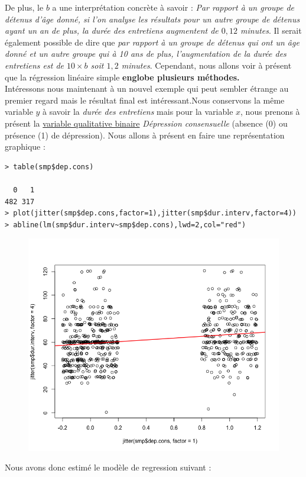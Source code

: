 De plus, le $b$ a une interprétation concrète à savoir : \textit{Par rapport à un groupe de détenus d'âge donné, si l'on analyse les résultats pour un autre groupe de détenus ayant un an de plus, la durée des entretiens augmentent de $0,12$ minutes}. Il serait également possible de dire que \textit{par rapport à un groupe de détenus qui ont un âge donné et un autre groupe qui à 10 ans de plus, l'augmentation de la durée des entretiens est de $10\times b$ soit $1,2$ minutes}.\newline
Cependant, nous allons voir à présent que la régression linéaire simple \textbf{englobe plusieurs méthodes.}\newline
\\
Intéressons nous maintenant à un nouvel exemple qui peut sembler étrange au premier regard mais le résultat final est intéressant.\newline Nous conservons la même variable $y$ à savoir la \textit{durée des entretiens} mais pour la variable $x$, nous prenons à présent la \underline{variable qualitative binaire} \textit{Dépression consensuelle} (absence (0) ou présence (1) de dépression). Nous allons à présent en faire une représentation graphique : 
\begin{lstlisting}[language=html]
> table(smp$dep.cons)

  0   1 
482 317 
> plot(jitter(smp$dep.cons,factor=1),jitter(smp$dur.interv,factor=4))
> abline(lm(smp$dur.interv~smp$dep.cons),lwd=2,col="red")
\end{lstlisting}
\begin{figure}[H]\begin{center}\includegraphics[scale=0.5]{ilu/ct.png}\end{center}\end{figure}
Nous avons donc estimé le modèle de regression suivant : 

